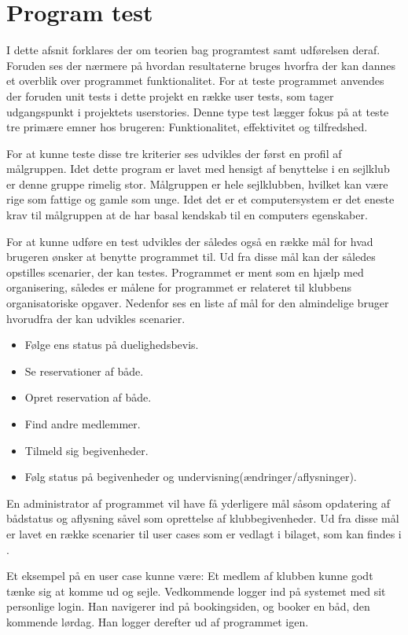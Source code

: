 \chapter{Program test}
I dette afsnit forklares der om teorien bag programtest samt udførelsen deraf. Foruden ses der nærmere på hvordan resultaterne bruges hvorfra der kan dannes et overblik over programmet funktionalitet. For at teste programmet anvendes der foruden unit tests i dette projekt en række user tests, som tager udgangspunkt i projektets userstories. Denne type test lægger fokus på at teste tre primære emner hos brugeren: Funktionalitet, effektivitet og tilfredshed. 

For at kunne teste disse tre kriterier ses udvikles der først en profil af målgruppen. Idet dette program er lavet med hensigt af benyttelse i en sejlklub er denne gruppe rimelig stor. Målgruppen er hele sejlklubben, hvilket kan være rige som fattige og gamle som unge. Idet det er et computersystem er det eneste krav til målgruppen at de har basal kendskab til en computers egenskaber.

For at kunne udføre en test udvikles der således også en række mål for hvad brugeren ønsker at benytte programmet til. Ud fra disse mål kan der således opstilles scenarier, der kan testes. Programmet er ment som en hjælp med organisering, således er målene for programmet er relateret til klubbens organisatoriske opgaver. Nedenfor ses en liste af mål for den almindelige bruger hvorudfra der kan udvikles scenarier.

\begin{itemize}
  \item Følge ens status på duelighedsbevis.
  \item Se reservationer af både.
  \item Opret reservation af både.
  \item Find andre medlemmer.
  \item Tilmeld sig begivenheder.
  \item Følg status på begivenheder og undervisning(ændringer/aflysninger).
\end{itemize}

En administrator af programmet vil have få yderligere mål såsom opdatering af bådstatus og aflysning såvel som oprettelse af klubbegivenheder. Ud fra disse mål er lavet en række scenarier til user cases som er vedlagt i bilaget, som kan findes i . 

\cbstart
Et eksempel på en user case kunne være: Et medlem af klubben kunne godt tænke sig at komme ud og sejle. Vedkommende logger ind på systemet med sit personlige login. Han navigerer ind på bookingsiden, og booker en båd, den kommende lørdag. Han logger derefter ud af programmet igen.

